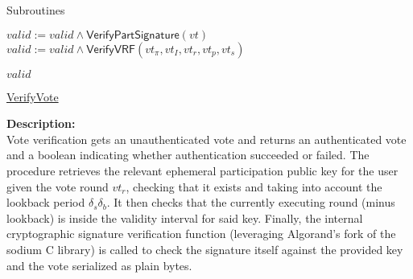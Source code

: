 \documentclass[10pt,a4paper]{article}
\begin{document}
\begin{section}{Subroutines}
\begin{algorithm}[H]
\begin{algorithmic}[1]
        \State $valid := valid \land \mathsf{VerifyPartSignature}(vt)$
        \State $valid := valid \land \mathsf{VerifyVRF}(vt_{\pi}, vt_I, vt_r, vt_p, vt_s)$

        \State \Return $valid$
    \EndFunction
    \end{algorithmic}
    \caption{\underline{VerifyVote}}
\end{algorithm}

\noindent \textbf{Description:}\\
Vote verification gets an unauthenticated vote and returns an authenticated vote and a
boolean indicating whether authentication succeeded or failed.
The procedure retrieves the relevant ephemeral participation public key for the user given the vote round $vt_r$,
checking that it exists and taking into account the lookback period $\delta_s\delta_b$.
It then checks that the currently executing round (minus lookback) is inside the validity interval for said key.
Finally, the internal cryptographic signature verification function (leveraging Algorand's fork of the sodium C library)
is called to check the signature itself against the provided key and the vote serialized as plain bytes.


        






\begin{algorithm}[H]
    \begin{algorithmic}[1]


\end{algorithmic}
\end{algorithm}
\end{section}
\end{document}

